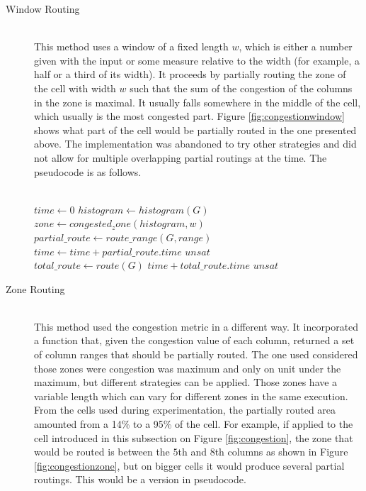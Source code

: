 \begin{description}
  \item[Window Routing] \hfill \\
  	This method uses a window of a fixed length $w$, which is either a number given with the input or some measure relative to the width (for example, a half or a third of its width). It proceeds by partially routing the zone of the cell with width $w$ such that the sum of the congestion of the columns in the zone is maximal. It usually falls somewhere in the middle of the cell, which usually is the most congested part. Figure \ref{fig:congestionwindow} shows what part of the cell would be partially routed in the one presented above. The implementation was abandoned to try other strategies and did not allow for multiple overlapping partial routings at the time. The pseudocode is as follows. \\
  	

\small
\begin{algorithmic}
 \\
\State $time \gets 0$
\State $histogram \gets histogram(G)$
\State $zone \gets congested_zone(histogram, w)$ \\

\State $partial\_route \gets route\_range(G, range)$
	\State $time \gets time + partial\_route.time$
\Else
	\State \Return $unsat$
\EndIf \\

\State $total\_route \gets route(G)$
	\State \Return $time + total\_route.time$
\Else
	\State \Return $unsat$
\EndIf

\EndFunction
\end{algorithmic}
\normalsize
  	
  \item[Zone Routing] \hfill \\
    This method used the congestion metric in a different way. It incorporated a function that, given the congestion value of each column, returned a set of column ranges that should be partially routed. The one used considered those zones were congestion was maximum and only on unit under the maximum, but different strategies can be applied. Those zones have a variable length which can vary for different zones in the same execution. From the cells used during experimentation, the partially routed area amounted from a 14\% to a 95\% of the cell. For example, if applied to the cell introduced in this subsection on Figure \ref{fig:congestion}, the zone that would be routed is between the $5$th and $8$th columns as shown in Figure \ref{fig:congestionzone}, but on bigger cells it would produce several partial routings. This would be a version in pseudocode. \\
    

\end{description}
